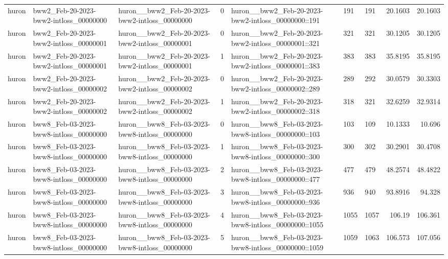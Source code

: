 \begin{longtable}{lllrlllrr}
huron & bww2\_Feb-20-2023-bww2-intloss\_00000000 & huron\_\_bww2\_Feb-20-2023-bww2-intloss\_00000000 & 0 & huron\_\_bww2\_Feb-20-2023-bww2-intloss\_00000000::191 & 191 & 191 & 20.1603 & 20.1603 \\
huron & bww2\_Feb-20-2023-bww2-intloss\_00000001 & huron\_\_bww2\_Feb-20-2023-bww2-intloss\_00000001 & 0 & huron\_\_bww2\_Feb-20-2023-bww2-intloss\_00000001::321 & 321 & 321 & 30.1205 & 30.1205 \\
huron & bww2\_Feb-20-2023-bww2-intloss\_00000001 & huron\_\_bww2\_Feb-20-2023-bww2-intloss\_00000001 & 1 & huron\_\_bww2\_Feb-20-2023-bww2-intloss\_00000001::383 & 383 & 383 & 35.8195 & 35.8195 \\
huron & bww2\_Feb-20-2023-bww2-intloss\_00000002 & huron\_\_bww2\_Feb-20-2023-bww2-intloss\_00000002 & 0 & huron\_\_bww2\_Feb-20-2023-bww2-intloss\_00000002::289 & 289 & 292 & 30.0579 & 30.3303 \\
huron & bww2\_Feb-20-2023-bww2-intloss\_00000002 & huron\_\_bww2\_Feb-20-2023-bww2-intloss\_00000002 & 1 & huron\_\_bww2\_Feb-20-2023-bww2-intloss\_00000002::318 & 318 & 321 & 32.6259 & 32.9314 \\
huron & bww8\_Feb-03-2023-bww8-intloss\_00000000 & huron\_\_bww8\_Feb-03-2023-bww8-intloss\_00000000 & 0 & huron\_\_bww8\_Feb-03-2023-bww8-intloss\_00000000::103 & 103 & 109 & 10.1333 & 10.696 \\
huron & bww8\_Feb-03-2023-bww8-intloss\_00000000 & huron\_\_bww8\_Feb-03-2023-bww8-intloss\_00000000 & 1 & huron\_\_bww8\_Feb-03-2023-bww8-intloss\_00000000::300 & 300 & 302 & 30.2901 & 30.4708 \\
huron & bww8\_Feb-03-2023-bww8-intloss\_00000000 & huron\_\_bww8\_Feb-03-2023-bww8-intloss\_00000000 & 2 & huron\_\_bww8\_Feb-03-2023-bww8-intloss\_00000000::477 & 477 & 479 & 48.2574 & 48.4822 \\
huron & bww8\_Feb-03-2023-bww8-intloss\_00000000 & huron\_\_bww8\_Feb-03-2023-bww8-intloss\_00000000 & 3 & huron\_\_bww8\_Feb-03-2023-bww8-intloss\_00000000::936 & 936 & 940 & 93.8916 & 94.328 \\
huron & bww8\_Feb-03-2023-bww8-intloss\_00000000 & huron\_\_bww8\_Feb-03-2023-bww8-intloss\_00000000 & 4 & huron\_\_bww8\_Feb-03-2023-bww8-intloss\_00000000::1055 & 1055 & 1057 & 106.19 & 106.361 \\
huron & bww8\_Feb-03-2023-bww8-intloss\_00000000 & huron\_\_bww8\_Feb-03-2023-bww8-intloss\_00000000 & 5 & huron\_\_bww8\_Feb-03-2023-bww8-intloss\_00000000::1059 & 1059 & 1063 & 106.573 & 107.056 \\

\end{longtable}
